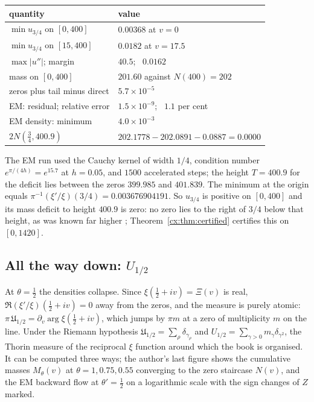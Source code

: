 \begin{center}
\small
\begin{tabular}{ll}
\toprule
quantity & value\\
\midrule
$\min u_{3/4}$ on $[0,400]$ & $0.00368$ at $v=0$\\
$\min u_{3/4}$ on $[15,400]$ & $0.0182$ at $v=17.5$\\
$\max|u''|$; margin & $40.5$; \ $0.0162$\\
mass on $[0,400]$ & $201.60$ against $N(400)=202$\\
zeros plus tail minus direct & $5.7\times10^{-5}$\\
EM: residual; relative error & $1.5\times10^{-9}$; \ $1.1$ per cent\\
EM density: minimum & $4.0\times10^{-3}$\\
$2N(\tfrac34,400.9)$ & $202.1778-202.0891-0.0887=0.0000$\\
\bottomrule
\end{tabular}
\end{center}

\noindent The EM run used the Cauchy kernel of width $1/4$, condition number $e^{\pi/(4h)}=e^{15.7}$ at $h=0.05$, and $1500$ accelerated steps; the height $T=400.9$ for the deficit lies between the zeros $399.985$ and $401.839$. The minimum at the origin equals $\pi^{-1}(\xi'/\xi)(3/4)=0.003676904191$. So $u_{3/4}$ is positive on $[0,400]$ and its mass deficit to height $400.9$ is zero: no zero lies to the right of $3/4$ below that height, as was known far higher \cite{PT21}; Theorem~\ref{cx:thm:certified} certifies this on $[0,1420]$.

\subsection{All the way down: $U_{1/2}$}\label{cx:sec:half}

At $\theta=\tfrac12$ the densities collapse. Since $\xi(\tfrac12+iv)=\Xi(v)$ is real, $\Re(\xi'/\xi)(\tfrac12+iv)=0$ away from the zeros, and the measure is purely atomic: $\pi\,\mathfrak U_{1/2}=\partial_v\arg\xi(\tfrac12+iv)$, which jumps by $\pi m$ at a zero of multiplicity $m$ on the line. Under the Riemann hypothesis $\mathfrak U_{1/2}=\sum_\rho\delta_{\gamma_\rho}$ and $U_{1/2}=\sum_{\gamma>0}m_\gamma\delta_{\gamma^2}$, the Thorin measure of the reciprocal $\xi$ function around which the book is organised. It can be computed three ways; the author's last figure shows the cumulative masses $M_\theta(v)$ at $\theta=1,0.75,0.55$ converging to the zero staircase $N(v)$, and the EM backward flow at $\theta'=\tfrac12$ on a logarithmic scale with the sign changes of $Z$ marked.

